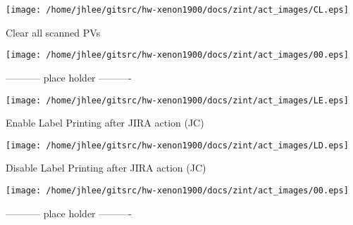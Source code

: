 \noindent
\vspace{1.4cm}
\begin{minipage}{.2\textwidth}
\begin{center}
\texttt{[image: /home/jhlee/gitsrc/hw-xenon1900/docs/zint/act\_images/CL.eps]}
\end{center}
\end{minipage}
\begin{minipage}{.7\textwidth}
Clear all scanned PVs
\end{minipage}


\noindent
\vspace{1.4cm}
\begin{minipage}{.2\textwidth}
\begin{center}
\texttt{[image: /home/jhlee/gitsrc/hw-xenon1900/docs/zint/act\_images/00.eps]}
\end{center}
\end{minipage}
\begin{minipage}{.7\textwidth}
----------- place holder ----------
\end{minipage}


\noindent
\vspace{1.4cm}
\begin{minipage}{.2\textwidth}
\begin{center}
\texttt{[image: /home/jhlee/gitsrc/hw-xenon1900/docs/zint/act\_images/LE.eps]}
\end{center}
\end{minipage}
\begin{minipage}{.7\textwidth}
Enable Label Printing after JIRA action (JC)
\end{minipage}


\noindent
\vspace{1.4cm}
\begin{minipage}{.2\textwidth}
\begin{center}
\texttt{[image: /home/jhlee/gitsrc/hw-xenon1900/docs/zint/act\_images/LD.eps]}
\end{center}
\end{minipage}
\begin{minipage}{.7\textwidth}
Disable Label Printing after JIRA action (JC)
\end{minipage}


\noindent
\vspace{1.4cm}
\begin{minipage}{.2\textwidth}
\begin{center}
\texttt{[image: /home/jhlee/gitsrc/hw-xenon1900/docs/zint/act\_images/00.eps]}
\end{center}
\end{minipage}
\begin{minipage}{.7\textwidth}
----------- place holder ----------
\end{minipage}


